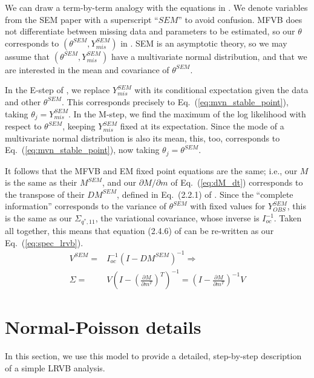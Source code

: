 \documentclass{article}\usepackage[]{graphicx}\usepackage[]{color}
\newcommand{\eq}[1]{Eq.~(\ref{eq:#1})}
\newcommand{\eqw}[1]{Eq.~(#1)}
\newcommand{\vbcov}{V} %
\theoremstyle{plain}
\begin{document}
We can draw a term-by-term analogy with
the equations in \citep{meng:1991:using}. We denote variables
from the SEM paper with a superscript ``$SEM$'' to avoid confusion.
MFVB does not differentiate between missing
data and parameters to be estimated, so our $\theta$ corresponds to
$(\theta^{SEM}, Y_{mis}^{SEM})$ in \citep{meng:1991:using}.
SEM is an asymptotic
theory, so we may assume that $(\theta^{SEM}, Y_{mis}^{SEM})$ have a
multivariate normal
distribution, and that we are interested in the mean and covariance of
$\theta^{SEM}$.

In the E-step of \citep{meng:1991:using}, we replace $Y_{mis}^{SEM}$ with
its conditional expectation given the data and other $\theta^{SEM}$.
This corresponds precisely to \eq{mvn_stable_point}, taking
$\theta_j = Y_{mis}^{SEM}$.  In the M-step, we find the maximum
of the log likelihood with respect to $\theta^{SEM}$, keeping
$Y_{mis}^{SEM}$ fixed at its expectation.  Since the mode
of a multivariate normal distribution is also its mean,
this, too, corresponds to \eq{mvn_stable_point}, now taking
$\theta_j = \theta^{SEM}$.

It follows that the MFVB and EM fixed point equations are the same;
i.e., our $M$ is the same as their $M^{SEM}$, and
our $\partial M / \partial m$ of \eq{dM_dt} corresponds
to the transpose of their $DM^{SEM}$, defined in \eqw{2.2.1}
of \citep{meng:1991:using}.  Since the ``complete information'' corresponds to
the variance of $\theta^{SEM}$ with fixed values for $Y_{OBS}^{SEM}$,
this is the same as our $\Sigma_{q^*,11}$, the variational covariance,
whose inverse is $I_{oc}^{-1}$.  Taken all together, this means that
equation (2.4.6) of \citep{meng:1991:using} can be
re-written as our \eq{spec_lrvb}.
%
\begin{align*}
V^{SEM} =& I_{oc}^{-1} \left(I - DM^{SEM}\right)^{-1} \Rightarrow\\
\Sigma =& \vbcov \left(I - \left(\frac{\partial M}{\partial m^T}\right)^T \right)^{-1}
       = \left(I - \frac{\partial M}{\partial m^T} \right)^{-1} \vbcov
\end{align*}

\section{Normal-Poisson details} \label{app:np_details}

In this section, we use this model to provide a detailed, step-by-step description of
a simple LRVB analysis.
\end{document}
